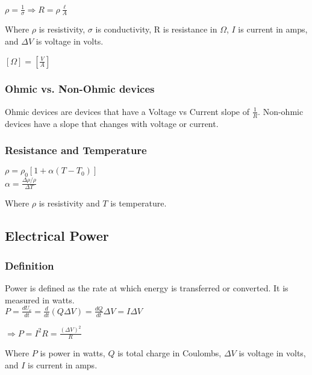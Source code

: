 \documentclass[12pt]{article}
\begin{document}
\vbox {
    \large\center
    $\rho = \frac{1}{\sigma} \Rightarrow R = \rho \frac{\ell}{A}$
}\vspace{12pt}

Where $\rho$ is resistivity, $\sigma$ is conductivity, R is resistance in $\Omega$, $I$ is current in amps, and $\Delta V$ is voltage in volts.

\vbox {
    \large\center
    $[\Omega] = [\frac{V}{A}]$
}\vspace{12pt}

\subsubsection*{Ohmic vs. Non-Ohmic devices}
\hspace{.5cm} Ohmic devices are devices that have a Voltage vs Current slope of $\frac{1}{R}$. Non-ohmic devices have a slope that changes with voltage or current.\\

\subsubsection*{Resistance and Temperature}
\vbox{
    \large\center
    $\rho = \rho_0[1+\alpha (T-T_0)]$\\
    \vspace{12pt}
    $\alpha = \frac{\Delta \rho/\rho}{\Delta T}$
}
\vspace{12pt}

Where $\rho$ is resistivity and $T$ is temperature.

\vspace{12pt}
\hrulefill

\begin{center}
\subsection*{Electrical Power}
\end{center}

\subsubsection*{Definition}
\hspace{.5cm} Power is defined as the rate at which energy is transferred or converted. It is measured in watts.\\
\vbox{
    \large\center
    $P = \frac{dU_e}{dt} = \frac{d}{dt} (Q\Delta V) = \frac{dQ}{dt}\Delta V = I\Delta V$
}

\vbox{
    \large\center
    $\Longrightarrow P = I^2R = \frac{(\Delta V)^2}{R}$
}
\vspace{12pt}

Where $P$ is power in watts, $Q$ is total charge in Coulombs, $\Delta V$ is voltage in volts, and $I$ is current in amps.
\end{document}
